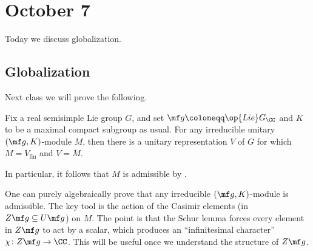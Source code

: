 \documentclass[../notes.tex]{subfiles}
\begin{document}
\section{October 7}
Today we discuss globalization.

\subsection{Globalization}
Next class we will prove the following.
\begin{theorem} \label{thm:hc-global}
	Fix a real semisimple Lie group $G$, and set $\mf g\coloneqq\op{Lie}G_\CC$ and $K$ to be a maximal compact subgroup as usual. For any irreducible unitary $(\mf g,K)$-module $M$, then there is a unitary representation $V$ of $G$ for which $M=V_{\mathrm{fin}}$ and $V=\overline M$.
\end{theorem}
\begin{remark}
	In particular, it follows that $M$ is admissible by .
\end{remark}
\begin{remark}
	One can purely algebraically prove that any irreducible $(\mf g,K)$-module is admissible. The key tool is the action of the Casimir elements (in $Z\mf g\subseteq U\mf g$) on $M$. The point is that the Schur lemma forces every element in $Z\mf g$ to act by a scalar, which produces an ``infinitesimal character'' $\chi\colon Z\mf g\to\CC$. This will be useful once we understand the structure of $Z\mf g$.
\end{remark}
\end{document}
